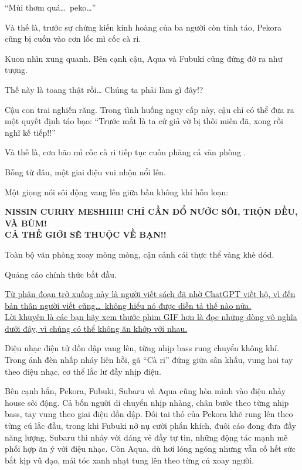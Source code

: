 \documentclass[../main.tex]{subfiles}
\begin{document}
``Mùi thơm quá\dots\ peko\dots''


Và thế là, trước sự chứng kiến kinh hoàng của ba người còn tỉnh táo, Pekora cũng bị cuốn vào cơn lốc mì cốc cà ri.

Kuon nhìn xung quanh. Bên cạnh cậu, Aqua và Fubuki cũng đứng đờ ra như tượng.

\begin{dialogue}
     Thế này là toang thật rồi\dots
     Chúng ta phải làm gì đây!?
\end{dialogue}

Cậu con trai nghiến răng. Trong tình huống nguy cấp này, cậu chỉ có thể đưa ra một quyết định táo bạo: ``Trước mắt là ta cứ giả vờ bị thôi miên đã, xong rồi nghĩ kế tiếp!!''

Và thế là, cơn bão mì cốc cà ri tiếp tục cuốn phăng cả văn phòng \hll.

Bỗng từ đâu, một giai điệu vui nhộn nổi lên.

Một giọng nói sôi động vang lên giữa bầu không khí hỗn loạn:

\begin{center}
    {\textbf{NISSIN CURRY MESHIIII! CHỈ CẦN ĐỔ NƯỚC SÔI, TRỘN ĐỀU, VÀ BÙM!\\CẢ THẾ GIỚI SẼ THUỘC VỀ BẠN!!}}
\end{center}

Toàn bộ văn phòng xoay mòng mòng, cận cảnh cái thực thể vàng khè dód.


Quảng cáo chính thức bắt đầu.

\begin{center}
    \uline{Từ phân đoạn trở xuống này là người viết sách đã nhờ ChatGPT viết hộ, vì đến bản thân người viết cũng\dots\ không hiểu nó được diễn tả thế nào nữa.\\Lời khuyên là các bạn hãy xem thước phim GIF hơn là đọc những dòng vô nghĩa dưới đây, vì chúng có thể không ăn khớp với nhau.}
\end{center}

\il


Điệu nhạc điện tử dồn dập vang lên, từng nhịp bass rung chuyển không khí. Trong ánh đèn nhấp nháy liên hồi, gã ``Cà ri'' đứng giữa sân khấu, vung hai tay theo điệu nhạc, cơ thể lắc lư đầy nhịp điệu.

Bên cạnh hắn, Pekora, Fubuki, Subaru và Aqua cũng hòa mình vào điệu nhảy house sôi động. Cả bốn người di chuyển nhịp nhàng, chân bước theo từng nhịp bass, tay vung theo giai điệu dồn dập. Đôi tai thỏ của Pekora khẽ rung lên theo từng cú lắc đầu, trong khi Fubuki nở nụ cười phấn khích, đuôi cáo đong đưa đầy năng lượng. Subaru thì nhảy với dáng vẻ đầy tự tin, những động tác mạnh mẽ phối hợp ăn ý với điệu nhạc. Còn Aqua, dù hơi lóng ngóng nhưng vẫn cố hết sức bắt kịp vũ đạo, mái tóc xanh nhạt tung lên theo từng cú xoay người.
\end{document}

